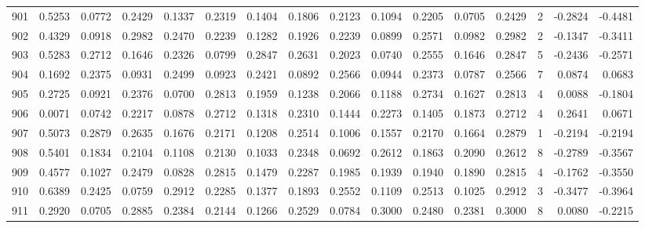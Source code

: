 \begin{tabular}{lrrrrrrrrrrrrrrr}
901 &      0.5253 &  0.0772 &  0.2429 &  0.1337 &  0.2319 &  0.1404 &  0.1806 &  0.2123 &  0.1094 &  0.2205 &   0.0705 &     0.2429 &      2 &                   -0.2824 &                    -0.4481 \\
902 &      0.4329 &  0.0918 &  0.2982 &  0.2470 &  0.2239 &  0.1282 &  0.1926 &  0.2239 &  0.0899 &  0.2571 &   0.0982 &     0.2982 &      2 &                   -0.1347 &                    -0.3411 \\
903 &      0.5283 &  0.2712 &  0.1646 &  0.2326 &  0.0799 &  0.2847 &  0.2631 &  0.2023 &  0.0740 &  0.2555 &   0.1646 &     0.2847 &      5 &                   -0.2436 &                    -0.2571 \\
904 &      0.1692 &  0.2375 &  0.0931 &  0.2499 &  0.0923 &  0.2421 &  0.0892 &  0.2566 &  0.0944 &  0.2373 &   0.0787 &     0.2566 &      7 &                    0.0874 &                     0.0683 \\
905 &      0.2725 &  0.0921 &  0.2376 &  0.0700 &  0.2813 &  0.1959 &  0.1238 &  0.2066 &  0.1188 &  0.2734 &   0.1627 &     0.2813 &      4 &                    0.0088 &                    -0.1804 \\
906 &      0.0071 &  0.0742 &  0.2217 &  0.0878 &  0.2712 &  0.1318 &  0.2310 &  0.1444 &  0.2273 &  0.1405 &   0.1873 &     0.2712 &      4 &                    0.2641 &                     0.0671 \\
907 &      0.5073 &  0.2879 &  0.2635 &  0.1676 &  0.2171 &  0.1208 &  0.2514 &  0.1006 &  0.1557 &  0.2170 &   0.1664 &     0.2879 &      1 &                   -0.2194 &                    -0.2194 \\
908 &      0.5401 &  0.1834 &  0.2104 &  0.1108 &  0.2130 &  0.1033 &  0.2348 &  0.0692 &  0.2612 &  0.1863 &   0.2090 &     0.2612 &      8 &                   -0.2789 &                    -0.3567 \\
909 &      0.4577 &  0.1027 &  0.2479 &  0.0828 &  0.2815 &  0.1479 &  0.2287 &  0.1985 &  0.1939 &  0.1940 &   0.1890 &     0.2815 &      4 &                   -0.1762 &                    -0.3550 \\
910 &      0.6389 &  0.2425 &  0.0759 &  0.2912 &  0.2285 &  0.1377 &  0.1893 &  0.2552 &  0.1109 &  0.2513 &   0.1025 &     0.2912 &      3 &                   -0.3477 &                    -0.3964 \\
911 &      0.2920 &  0.0705 &  0.2885 &  0.2384 &  0.2144 &  0.1266 &  0.2529 &  0.0784 &  0.3000 &  0.2480 &   0.2381 &     0.3000 &      8 &                    0.0080 &                    -0.2215 \\

\end{tabular}
